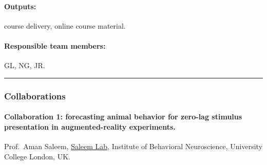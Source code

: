 \paragraph{Outputs:} course delivery, online course material.

\paragraph{Responsible team members:} GL, NG, JR.

\noindent\rule{\textwidth}{1pt}
\subsubsection*{Collaborations}

\paragraph{Collaboration 1: forecasting animal behavior for zero-lag stimulus
presentation in augmented-reality experiments.} Prof.~Aman Saleem,
\href{https://www.saleemlab.com/}{Saleem Lab}, Institute of Behavioral
Neuroscience, University College London, UK.


